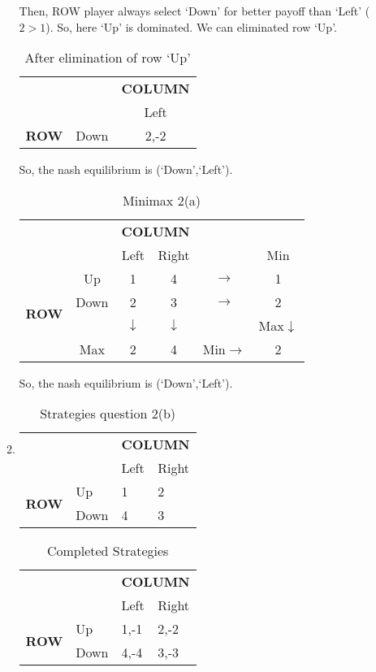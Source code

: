\documentclass[a4paper,12pt]{article}
\begin{document}
\begin{enumerate}
\begin{enumerate}
Then, ROW player always select `Down' for better payoff than `Left' ($2>1$). So, here `Up' is dominated. We can eliminated row `Up'.

\begin{table}[H]
\centering
\begin{tabular}{@{}ccc@{}}
\toprule
& & \multicolumn{1}{c}{\bfseries COLUMN}\\
& & Left\\
{\bfseries ROW} & Down & 2,-2\\
\bottomrule
\end{tabular}
\caption{After elimination of row `Up'}
\end{table}

 So, the nash equilibrium is (`Down',`Left').

\begin{table}[H]
\centering
\begin{tabular}{@{}cccccc@{}}
\toprule
& & \multicolumn{2}{c}{\bfseries COLUMN}\\
& & Left & Right && Min\\
\multirow{4}{*}{\bfseries ROW} & Up & 1 & 4 &$\rightarrow$& 1\\
 & Down & 2 & 3 &$\rightarrow$& 2\\
 & & $\downarrow$ & $\downarrow$ & & Max$\downarrow$\\
 & Max & 2 & 4&Min$\rightarrow$&2\\
\bottomrule
\end{tabular}
\caption{Minimax 2(a)}
\end{table}
So, the nash equilibrium is (`Down',`Left').

\item%
\begin{table}[H]
\centering
\begin{tabular}{@{}llll@{}}
\toprule
& & \multicolumn{2}{c}{\bfseries COLUMN}\\
& & Left & Right\\
\multirow{2}{*}{\bfseries ROW} & Up & 1 & 2\\
 & Down & 4 & 3\\
\bottomrule
\end{tabular}
\caption{Strategies question 2(b)}
\end{table}


\begin{table}[H]
\centering
\begin{tabular}{@{}llll@{}}
\toprule
& & \multicolumn{2}{c}{\bfseries COLUMN}\\
& & Left & Right\\
\multirow{2}{*}{\bfseries ROW} & Up & 1,-1 & 2,-2\\
 & Down & 4,-4 & 3,-3\\
\bottomrule
\end{tabular}
\caption{Completed Strategies}
\label{tab:completeb}
\end{table}


\end{enumerate}
\end{enumerate}
\end{document}
